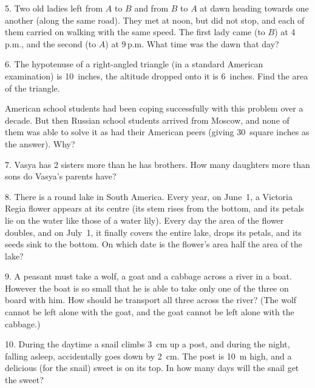 \begin{problem}{5.}
	Two old ladies left from $A$ to $B$ and from $B$ to $A$ at dawn
	heading towards one another (along the same road). They met at noon,
	but did not stop, and each of them carried on walking with the same speed.
	The first lady came (to $B$) at 4\,p.m., and the second (to $A$) at 9\,p.m. What time was the dawn that day? 
\end{problem}

\begin{problem}{6.}
	The hypotenuse of a right-angled triangle (in a standard American examination) is 10~inches,
	the altitude dropped onto it is 6~inches. Find the area of the triangle.

	American school students had been coping successfully with this problem over a decade.
	But then Russian school students arrived from Moscow, and none of them was able to solve it as had their American peers
	(giving 30~square inches as the answer). Why? 
\end{problem}

\begin{problem}{7.}
	Vasya has 2 sisters more than he has brothers. How many daughters more than sons do Vasya's parents have?
\end{problem}

\begin{problem}{8.}
	There is a round lake in South America. Every year, on June~1, a Victoria Regia flower appears at its
	centre (its stem rises from the bottom, and its petals lie on the water like those of a water lily). Every day
	the area of the flower doubles, and on July~1, it finally covers the entire lake, drops its petals, and its seeds
	sink to the bottom. On which date is the flower's area half the area of the lake?    
\end{problem}

\begin{problem}{9.}
	A peasant must take a wolf, a goat and a cabbage across a river in a boat. However the boat is so small that
	he is able to take only one of the three on board with him. How should he transport all three across
	the river? (The wolf cannot be left alone with the goat, and the goat cannot be left alone with the cabbage.)
\end{problem}

\begin{problem}{10.}
	During the daytime a snail climbs \SI{3}{\cm} up a post, and during the night, falling asleep, accidentally
	goes down by \SI{2}{\cm}. The post is \SI{10}{\metre} high, and a delicious (for the snail) sweet is on its top.
	In how many days will the snail get the sweet?
\end{problem}

